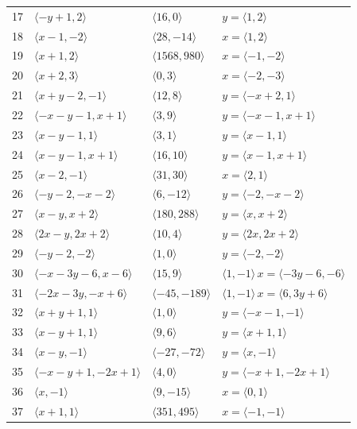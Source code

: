 \documentclass[11pt]{article}
\begin{document}
\begin{longtable}{@{}rlll@{}}
17 & $\langle -y+1,2\rangle$ & $\langle 16,0\rangle$ & $y=\langle 1,2\rangle$\\
18 & $\langle x-1,-2\rangle$ & $\langle 28,-14\rangle$ & $x=\langle 1,2\rangle$\\
19 & $\langle x+1,2\rangle$ & $\langle 1568,980\rangle$ & $x=\langle -1,-2\rangle$\\
20 & $\langle x+2,3\rangle$ & $\langle 0,3\rangle$ & $x=\langle -2,-3\rangle$\\
21 & $\langle x+y-2,-1\rangle$ & $\langle 12,8\rangle$ & $y=\langle -x+2,1\rangle$\\
22 & $\langle -x-y-1,x+1\rangle$ & $\langle 3,9\rangle$ & $y=\langle -x-1,x+1\rangle$\\
23 & $\langle x-y-1,1\rangle$ & $\langle 3,1\rangle$ & $y=\langle x-1,1\rangle$\\
24 & $\langle x-y-1,x+1\rangle$ & $\langle 16,10\rangle$ & $y=\langle x-1,x+1\rangle$\\
25 & $\langle x-2,-1\rangle$ & $\langle 31,30\rangle$ & $x=\langle 2,1\rangle$\\
26 & $\langle -y-2,-x-2\rangle$ & $\langle 6,-12\rangle$ & $y=\langle -2,-x-2\rangle$\\
27 & $\langle x-y,x+2\rangle$ & $\langle 180,288\rangle$ & $y=\langle x,x+2\rangle$\\
28 & $\langle 2x-y,2x+2\rangle$ & $\langle 10,4\rangle$ & $y=\langle 2x,2x+2\rangle$\\
29 & $\langle -y-2,-2\rangle$ & $\langle 1,0\rangle$ & $y=\langle -2,-2\rangle$\\
30 & $\langle -x-3y-6,x-6\rangle$ & $\langle 15,9\rangle$ & $\langle 1,-1\rangle\,x=\langle -3y-6,-6\rangle$\\
31 & $\langle -2x-3y,-x+6\rangle$ & $\langle -45,-189\rangle$ & $\langle 1,-1\rangle\,x=\langle 6,3y+6\rangle$\\
32 & $\langle x+y+1,1\rangle$ & $\langle 1,0\rangle$ & $y=\langle -x-1,-1\rangle$\\
33 & $\langle x-y+1,1\rangle$ & $\langle 9,6\rangle$ & $y=\langle x+1,1\rangle$\\
34 & $\langle x-y,-1\rangle$ & $\langle -27,-72\rangle$ & $y=\langle x,-1\rangle$\\
35 & $\langle -x-y+1,-2x+1\rangle$ & $\langle 4,0\rangle$ & $y=\langle -x+1,-2x+1\rangle$\\
36 & $\langle x,-1\rangle$ & $\langle 9,-15\rangle$ & $x=\langle 0,1\rangle$\\
37 & $\langle x+1,1\rangle$ & $\langle 351,495\rangle$ & $x=\langle -1,-1\rangle$\\

\end{longtable}
\end{document}
